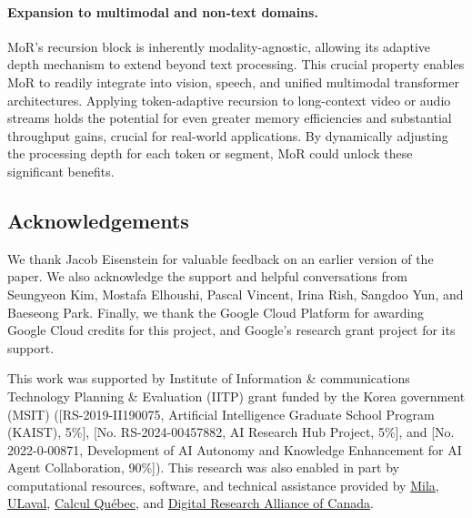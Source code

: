 \vspace{-12pt}
\paragraph{Expansion to multimodal and non‑text domains.} 

MoR's recursion block is inherently modality-agnostic, allowing its adaptive depth mechanism to extend beyond text processing. This crucial property enables MoR to readily integrate into vision, speech, and unified multimodal transformer architectures. Applying token-adaptive recursion to long-context video or audio streams holds the potential for even greater memory efficiencies and substantial throughput gains, crucial for real-world applications. By dynamically adjusting the processing depth for each token or segment, MoR could unlock these significant benefits.


\clearpage
\subsection{Acknowledgements}

We thank Jacob Eisenstein for valuable feedback on an earlier version of the paper. We also acknowledge the support and helpful conversations from Seungyeon Kim, Mostafa Elhoushi, Pascal Vincent, Irina Rish, Sangdoo Yun, and Baeseong Park. Finally, we thank the Google Cloud Platform for awarding Google Cloud credits for this project, and Google's research grant project for its support.

This work was supported by Institute of Information \& communications Technology Planning \& Evaluation (IITP) grant funded by the Korea government (MSIT) ([RS-2019-II190075, Artificial Intelligence Graduate School Program (KAIST), 5\%], [No. RS-2024-00457882, AI Research Hub Project, 5\%], and [No. 2022-0-00871, Development of AI Autonomy and Knowledge Enhancement for AI Agent Collaboration, 90\%]). This research was also enabled in part by computational resources, software, and technical assistance provided by \href{https://mila.quebec/en}{Mila},  \href{https://www.ulaval.ca/}{ULaval}, \href{https://www.calculquebec.ca/}{ Calcul Québec}, and \href{https://alliancecan.ca/en}{Digital Research Alliance of Canada}.
